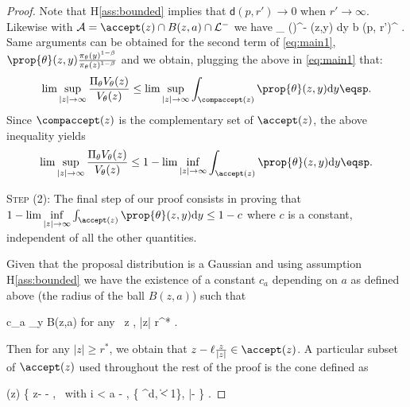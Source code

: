 \documentclass[10pt,twocolumn,letterpaper]{article}
\begin{document}
\begin{proof}
Note that H\ref{ass:bounded} implies that $\mathsf{d}(p, r') \to 0$ when $r' \to \infty$.
Likewise with  $\mathcal{A} = \accept(z) \cap B(z,a) \cap \mathcal{L}^-$ we have
\beq
\int_{} ()^{-\beta} \prop{\theta}(z,y) \textrm{d}y  \leq b (p, r')^{\beta} \eqsp.
\eeq
Same arguments can be obtained for the second term of \eqref{eq:main1}, \ie\ $\prop{\theta}(z,y) \frac{\pi_\theta(y)^{1-\beta}}{\pi_\theta(z)^{1-\beta}}$ and we obtain, plugging the above in \eqref{eq:main1} that:
\begin{align}
\lim \sup \limits_{|z| \to \infty}  \frac{\Pi_\theta V_\theta(z)}{V_\theta(z)} \leq \lim \sup \limits_{|z| \to \infty}  \int_{\compaccept(z)} \prop{\theta}(z,y)  \textrm{d}y \eqsp.
\end{align}
Since $\compaccept(z)$ is the complementary set of $\accept(z)$, the above inequality yields
\begin{align}
\lim \sup \limits_{|z| \to \infty}  \frac{\Pi_\theta V_\theta(z)}{V_\theta(z)} \leq 1 - \lim \inf \limits_{|z| \to \infty}  \int_{\accept(z)} \prop{\theta}(z,y)  \textrm{d}y \eqsp.
\end{align}



\medskip
\noindent \textsc{Step (2): } The final step of our proof consists in proving that $1 - \lim \inf \limits_{|z| \to \infty}  \int_{\accept(z)} \prop{\theta}(z,y)  \textrm{d}y \leq 1 - c$ where $c$ is a constant, independent of all the other quantities.


Given that the proposal distribution is a Gaussian and using assumption H\ref{ass:bounded} we have the existence of a constant $c_a$ depending on $a$ as defined above (the radius of the ball $B(z,a)$) such that

\beq\label{eq:gauss}
 \leq  c_a \leq \inf \limits_{y \in B(z,a)}  \quad \textrm{for any} \, z \in \zset, |z| \geq r^* \eqsp.
\eeq

Then for any $|z| \geq r^*$, we obtain that $z- \ell \frac{z}{|z|} \in \accept(z)$.
A particular subset of $\accept(z)$ used throughout the rest of the proof is the cone defined as 

\beq\label{eq:defcone}
(z) \eqdef \{ z- \ell {} - \kappa \nu , \, \textrm{with} \quad i < a - \ell  , \nu \in \{ \nu \in \rset^d, \| \nu \| < 1\}, |\nu -  \leq {}   \} \eqsp.
\eeq


\end{proof}
\end{document}
